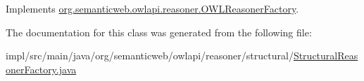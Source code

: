 Implements \hyperlink{interfaceorg_1_1semanticweb_1_1owlapi_1_1reasoner_1_1_o_w_l_reasoner_factory_a4b84ad313506d9feeef49ace704bc4df}{org.\-semanticweb.\-owlapi.\-reasoner.\-O\-W\-L\-Reasoner\-Factory}.



The documentation for this class was generated from the following file\-:\begin{DoxyCompactItemize}
\item 
impl/src/main/java/org/semanticweb/owlapi/reasoner/structural/\hyperlink{_structural_reasoner_factory_8java}{Structural\-Reasoner\-Factory.\-java}\end{DoxyCompactItemize}
